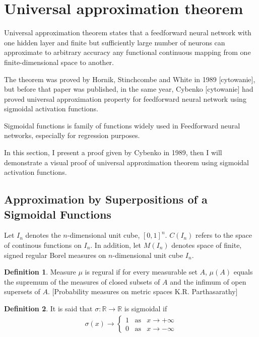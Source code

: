 \documentclass[]{article}
\theoremstyle{definition}
\newtheorem{definition}{Definition}[section]
\begin{document}
\newpage
\section{Universal approximation theorem}

Universal approximation theorem states that a feedforward neural network with one hidden layer and finite but sufficiently large number of neurons can approximate to arbitrary accuracy any functional continuous mapping from one finite-dimensional space to another. 


The theorem was proved by Hornik, Stinchcombe and White in 1989 [cytowanie], but before that paper was published, in the same year, Cybenko [cytowanie] had proved universal approximation property for feedforward neural network using sigmoidal activation functions.

Sigmoidal functions is family of functions widely used in Feedforward neural networks, especially for regression purposes.

In this section, I present a proof given by Cybenko in 1989, then I will demonstrate a visual proof of universal approximation theorem using sigmoidal activation functions.



\subsection{Approximation by Superpositions of a Sigmoidal Functions}

Let $I_n$ denotes the $n$-dimensional unit cube, $[0,1]^n$. $C(I_n)$ refers to the space of continous functions on $I_n$. In addition, let $M(I_n)$ denotes space of finite, signed regular Borel measures on $n$-dimensional unit cube $I_n$. 


\begin{definition}
Measure $\mu$ is regural if for every measurable set $A$, $\mu(A)$ equals the supremum of the measures of closed subsets of $A$ and the infimum of open supersets of $A$. [Probability measures on metric spaces K.R. Parthasarathy]	
\end{definition}
 
 
% 
% 

\begin{definition}
	It is said that $\sigma: \mathbb{R} \rightarrow \mathbb{R}$ is sigmoidal if
	\begin{eqnarray*}
		\sigma(x) \rightarrow \begin{cases} 1 \;\;\;\text{as} &x \rightarrow +\infty\\ 0 \;\;\;\text{as} &x \rightarrow -\infty\end{cases}
	\end{eqnarray*}
	
\end{definition}
\end{document}
